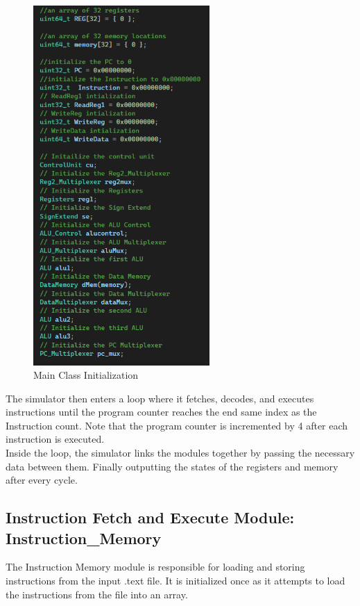 \documentclass{article}
\begin{document}
\begin{figure}[htbp]
    \centering
    \includegraphics[width=0.6\textwidth]{screen_dumps/main_initializing.png}
    \caption{Main Class Initialization}
    \label{fig:1}
\end{figure}

The simulator then enters a loop where it fetches, decodes, and executes instructions until the program counter reaches the end same index as the Instruction count. Note that the program counter is incremented by 4 after each instruction is executed.\\

Inside the loop, the simulator links the modules together by passing the necessary data between them. Finally outputting the states of the registers and memory after every cycle.\\

\subsection{Instruction Fetch and Execute Module: Instruction\_Memory}
The Instruction Memory module is responsible for loading and storing instructions from the input .text file. It is initialized once as it attempts to load the instructions from the file into an array.\\
\end{document}
